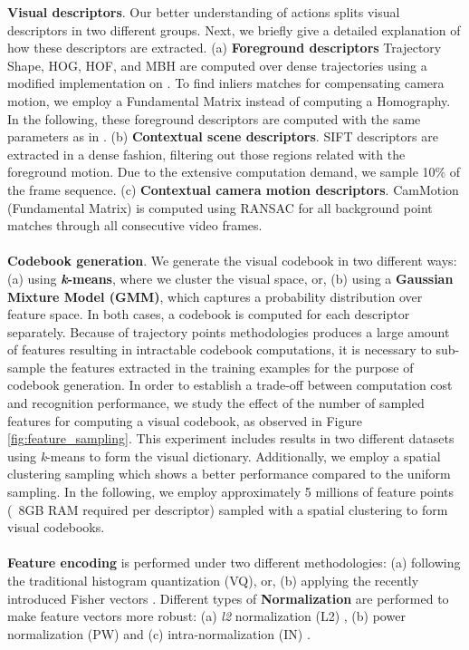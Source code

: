 \textbf{Visual descriptors}. Our better understanding of actions splits visual descriptors in two different groups. Next, we briefly give a detailed explanation of how these descriptors are extracted.
(a) \textbf{Foreground descriptors} \ie Trajectory Shape, HOG, HOF, and MBH are computed over dense trajectories using a modified implementation on \cite{wang2013}. To find inliers matches for compensating camera motion, we employ a Fundamental Matrix instead of computing a Homography. In the following, these foreground descriptors are computed with the same parameters as in \cite{wang2013}.
(b) \textbf{Contextual scene descriptors}. SIFT descriptors are extracted in a dense fashion, filtering out those regions related with the foreground motion. Due to the extensive computation demand, we sample 10\% of the frame sequence.
(c) \textbf{Contextual camera motion descriptors}. CamMotion (Fundamental Matrix) is computed using RANSAC for all background point matches through all consecutive video frames.\\\\
\textbf{Codebook generation}. We generate the visual codebook in two different ways: (a) using \textbf{\textit{k}-means}, where we cluster the visual space, or, (b) using a \textbf{Gaussian Mixture Model (GMM)}, which captures a probability distribution over feature space. In both cases, a codebook is computed for each descriptor separately. Because of trajectory points methodologies produces a large amount of features resulting in intractable codebook computations, it is necessary to sub-sample the features extracted in the training examples for the purpose of codebook generation. In order to establish a trade-off between computation cost and recognition performance, we study the effect of the number of sampled features for computing a visual codebook, as observed in Figure \ref{fig:feature_sampling}. This experiment includes results in two different datasets using \textit{k}-means to form the visual dictionary. Additionally, we employ a spatial clustering sampling  which shows a better performance compared to the uniform sampling. In the following, we employ approximately 5 millions of feature points (~8GB RAM required per descriptor) sampled with a spatial clustering to form visual codebooks.\\\\
\textbf{Feature encoding} is performed under two different methodologies: (a) following the traditional histogram quantization (VQ), or, (b) applying the recently introduced Fisher vectors \cite{perronnin2010}. Different types of \textbf{Normalization} are performed to make feature vectors more robust: (a) \textit{l2} normalization (L2) \cite{perronnin2010}, (b) power normalization (PW) \cite{perronnin2010} and (c) intra-normalization (IN) \cite{xwang2013}. \\\\
